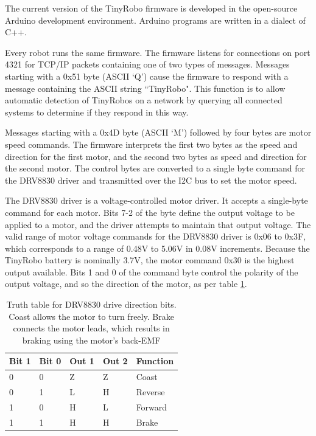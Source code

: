 \documentclass[]{article}
\begin{document}
The current version of the TinyRobo firmware is developed in the open-source Arduino development environment.
Arduino programs are written in a dialect of C++. 

Every robot runs the same firmware. 
The firmware listens for connections on port 4321 for TCP/IP packets containing one of two types of messages. 
Messages starting with a 0x51 byte (ASCII `Q') cause the firmware to respond with a message containing the ASCII string ``TinyRobo". 
This function is to allow automatic detection of TinyRobos on a network by querying all connected systems to determine if they respond in this way. 

Messages starting with a 0x4D byte (ASCII `M') followed by four bytes are motor speed commands.
The firmware interprets the first two bytes as the speed and direction for the first motor, and the second two bytes as speed and direction for the second motor.
The control bytes are converted to a single byte command for the DRV8830 driver and transmitted over the I2C bus to set the motor speed.
 
The DRV8830 driver is a voltage-controlled motor driver. 
It accepts a single-byte command for each motor. 
Bits 7-2 of the byte define the output voltage to be applied to a motor, and the driver attempts to maintain that output voltage.
The valid range of motor voltage commands for the DRV8830 driver is 0x06 to 0x3F, which corresponds to a range of 0.48V to 5.06V in 0.08V increments. 
Because the TinyRobo battery is nominally 3.7V, the motor command 0x30 is the highest output available. 
Bits 1 and 0 of the command byte control the polarity of the output voltage, and so the direction of the motor, as per table \ref{tab:DRV8830_truth}.

\begin{table}
	\begin{tabular}{l l l l l}
	Bit 1 & Bit 0 & Out 1 & Out 2 & Function\\
	\hline
	0 & 0 & Z & Z & Coast\\
	0 & 1 & L & H & Reverse\\
	1 & 0 & H & L & Forward\\
	1 & 1 & H & H & Brake\\				
	\end{tabular}
	
	\caption{Truth table for DRV8830 drive direction bits. Coast allows the motor to turn freely. Brake connects the motor leads, which results in braking using the motor's back-EMF}
	\label{tab:DRV8830_truth}
\end{table}
\end{document}

